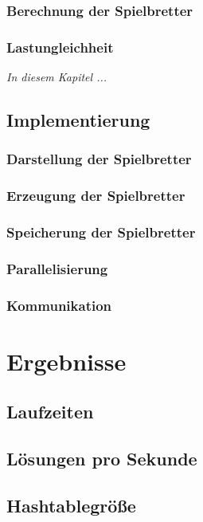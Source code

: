 \documentclass[
	12pt,
	a4paper,
	BCOR10mm,
	DIV14,
	listof=totoc,
	bibliography=totoc,
	headsepline
]{scrreprt}
\begin{document}
\subsection{Berechnung der Spielbretter}
\subsection{Lastungleichheit}

\textit{%
In diesem Kapitel ...
}
\bigskip

\section{Implementierung}
\subsection{Darstellung der Spielbretter}
\subsection{Erzeugung der Spielbretter}
\subsection{Speicherung der Spielbretter}
\subsection{Parallelisierung}
\subsection{Kommunikation}


\chapter{Ergebnisse}
\label{Ergebnisse}

\section{Laufzeiten}

\section{Lösungen pro Sekunde}

\section{Hashtablegröße}
\end{document}
